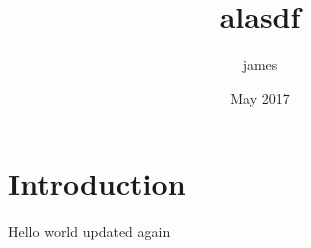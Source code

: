 \documentclass{article}
\title{alasdf}
\author{james }
\date{May 2017}
\begin{document}
\maketitle

\section{Introduction}

Hello world updated again
\end{document}
